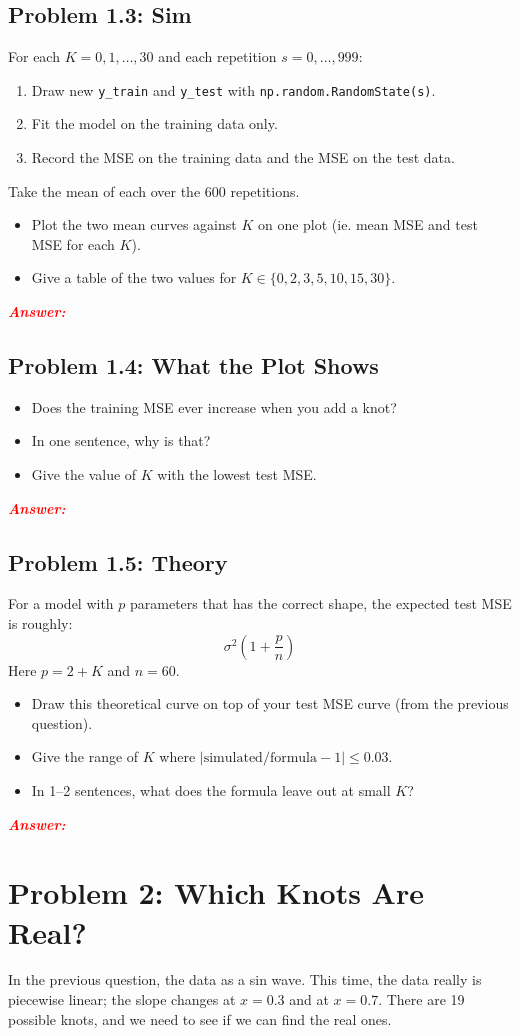 \documentclass[11pt, letterpaper]{article}
\newcommand{\problem}[1]{\section*{Problem #1}}
\newcommand{\subproblem}[1]{\subsection*{Problem #1}}
\newcommand{\answer}{\textbf{\textit{\textcolor{red}{Answer:}}}}
\begin{document}
\subproblem{1.3: Sim}
For each $K = 0, 1, \dots, 30$ and each repetition $s = 0, \dots, 999$:
\begin{enumerate}
    \item Draw new \texttt{y\_train} and \texttt{y\_test} with \texttt{np.random.RandomState(s)}.
    \item Fit the model on the training data only.
    \item Record the MSE on the training data and the MSE on the test data.
\end{enumerate}
Take the mean of each over the 600 repetitions.
\begin{itemize}
    \item Plot the two mean curves against $K$ on one plot (ie. mean MSE and test MSE for each $K$).
    \item Give a table of the two values for $K \in \{0, 2, 3, 5, 10, 15, 30\}$.
\end{itemize}

\answer

\subproblem{1.4: What the Plot Shows}
\begin{itemize}
    \item Does the training MSE ever increase when you add a knot? 
    \item In one sentence, why is that?
    \item Give the value of $K$ with the lowest test MSE.
\end{itemize}

\answer

\subproblem{1.5: Theory}
For a model with $p$ parameters that has the correct shape, the expected test MSE is roughly:
$$
\sigma^2 \left( 1 + \frac{p}{n} \right)
$$
Here $p = 2 + K$ and $n = 60$.
\begin{itemize}
    \item Draw this theoretical curve on top of your test MSE curve (from the previous question).
    \item Give the range of $K$ where $\left| \text{simulated} / \text{formula} - 1 \right| \le 0.03$.
    \item In 1--2 sentences, what does the formula leave out at small $K$?
\end{itemize}

\answer

\pagebreak

\problem{2: Which Knots Are Real?}

In the previous question, the data as a sin wave. This time, the data really is piecewise linear; the slope changes at $x = 0.3$ and at
$x = 0.7$. There are 19 possible knots, and we need to see if we can find the real ones.
\end{document}
